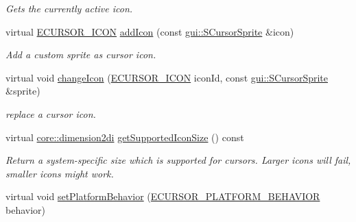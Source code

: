 \begin{DoxyCompactItemize}
\begin{DoxyCompactList}\small\item\em Gets the currently active icon. \end{DoxyCompactList}\item 
virtual \hyperlink{namespaceirr_1_1gui_aefee802dd632c5735703e40ef40f879b}{E\+C\+U\+R\+S\+O\+R\+\_\+\+I\+C\+ON} \hyperlink{classirr_1_1gui_1_1ICursorControl_a102ff455c70595886281e636ef063d3b}{add\+Icon} (const \hyperlink{structirr_1_1gui_1_1SCursorSprite}{gui\+::\+S\+Cursor\+Sprite} \&icon)
\begin{DoxyCompactList}\small\item\em Add a custom sprite as cursor icon. \end{DoxyCompactList}\item 
virtual void \hyperlink{classirr_1_1gui_1_1ICursorControl_a3e7c8cb1f03e1ccc31fcc3c30f717762}{change\+Icon} (\hyperlink{namespaceirr_1_1gui_aefee802dd632c5735703e40ef40f879b}{E\+C\+U\+R\+S\+O\+R\+\_\+\+I\+C\+ON} icon\+Id, const \hyperlink{structirr_1_1gui_1_1SCursorSprite}{gui\+::\+S\+Cursor\+Sprite} \&sprite)
\begin{DoxyCompactList}\small\item\em replace a cursor icon. \end{DoxyCompactList}\item 
virtual \hyperlink{namespaceirr_1_1core_ac79bc3704cf28bc1ab72d7cd1cae78d1}{core\+::dimension2di} \hyperlink{classirr_1_1gui_1_1ICursorControl_ad2c301e1c82366520913c270ef8d738c}{get\+Supported\+Icon\+Size} () const \hypertarget{classirr_1_1gui_1_1ICursorControl_ad2c301e1c82366520913c270ef8d738c}{}\label{classirr_1_1gui_1_1ICursorControl_ad2c301e1c82366520913c270ef8d738c}

\begin{DoxyCompactList}\small\item\em Return a system-\/specific size which is supported for cursors. Larger icons will fail, smaller icons might work. \end{DoxyCompactList}\item 
virtual void \hyperlink{classirr_1_1gui_1_1ICursorControl_ad7688bb200945f15877a598e8be53878}{set\+Platform\+Behavior} (\hyperlink{namespaceirr_1_1gui_abbd186f9cfba2f805d98248df226acef}{E\+C\+U\+R\+S\+O\+R\+\_\+\+P\+L\+A\+T\+F\+O\+R\+M\+\_\+\+B\+E\+H\+A\+V\+I\+OR} behavior)\hypertarget{classirr_1_1gui_1_1ICursorControl_ad7688bb200945f15877a598e8be53878}{}\label{classirr_1_1gui_1_1ICursorControl_ad7688bb200945f15877a598e8be53878}


\end{DoxyCompactItemize}
